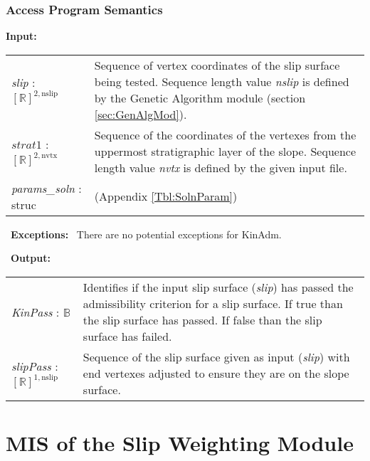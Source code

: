 \documentclass[12pt, titlepage]{article}
\begin{document}
\subsubsection{Access Program Semantics}
\textbf{Input:}
\renewcommand*{\arraystretch}{1.5}
\begin{longtable}{p{} p{}}
  \textit{slip} : $[\mathbb{R}]^{2,\text{nslip}}$ & Sequence of vertex
  coordinates of the slip surface being tested. Sequence length value
  \textit{nslip} is defined by the Genetic Algorithm module (section
  \ref{sec:GenAlgMod}).\\
  
  $\textit{strat1}$ : $[\mathbb{R}]^{2,\text{nvtx}}$ & Sequence of
  the coordinates of the vertexes from the uppermost stratigraphic
  layer of the slope. Sequence length value \textit{nvtx} is defined
  by the given input file. \\
  
  \textit{params\_soln} : struc & (Appendix
  \ref{Tbl:SolnParam})
\end{longtable}

~\newline\noindent \textbf{Exceptions:} ~\newline\noindent There are
no potential exceptions for KinAdm.

~\newline\noindent \textbf{Output:}
\renewcommand{\arraystretch}{1.5}
\begin{longtable}{p{} p{}}
  \textit{KinPass} : $\mathbb{B}$ & Identifies if the input slip
  surface (\textit{slip}) has passed the admissibility criterion for a
  slip surface. If true than the slip surface has passed. If false
  than the slip surface has failed. \\

  \textit{slipPass} : $[\mathbb{R}]^{1,\text{nslip}}$ & Sequence of
  the slip surface given as input (\textit{slip}) with end vertexes
  adjusted to ensure they are on the slope surface.
\end{longtable}


\section{MIS of the Slip Weighting
  Module} \label{sec:WeightMod}
\end{document}
